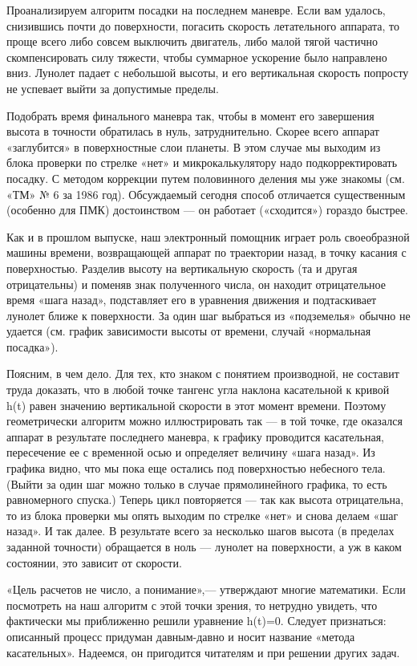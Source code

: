 \documentclass[11pt,a4paper,oneside]{article}
\begin{document}
Проанализируем алгоритм посадки на последнем маневре. Если вам удалось, снизившись почти до поверхности, погасить скорость летательного аппарата, то проще всего либо совсем выключить двигатель, либо малой тягой частично скомпенсировать силу тяжести, чтобы суммарное ускорение было направлено вниз. Лунолет падает с небольшой высоты, и его вертикальная скорость попросту не успевает выйти за допустимые пределы.

Подобрать время финального маневра так, чтобы в момент его завершения высота в точности обратилась в нуль, затруднительно. Скорее всего аппарат «заглубится» в поверхностные слои планеты. В этом случае мы выходим из блока проверки по стрелке «нет» и микрокалькулятору надо подкорректировать посадку. С методом коррекции путем половинного деления мы уже знакомы (см. «ТМ» № 6 за 1986 год). Обсуждаемый сегодня способ отличается существенным (особенно для ПМК) достоинством — он работает («сходится») гораздо быстрее.

Как и в прошлом выпуске, наш электронный помощник играет роль своеобразной машины времени, возвращающей аппарат по траектории назад, в точку касания с поверхностью. Разделив высоту на вертикальную скорость (та и другая отрицательны) и поменяв знак полученного числа, он находит отрицательное время «шага назад», подставляет его в уравнения движения и подтаскивает лунолет ближе к поверхности. За один шаг выбраться из «подземелья» обычно не удается (см. график зависимости высоты от времени, случай «нормальная посадка»). 

Поясним, в чем дело. Для тех, кто знаком с понятием производной, не составит труда доказать, что в любой точке тангенс угла наклона касательной к кривой h(t) равен значению вертикальной скорости в этот момент времени. Поэтому геометрически алгоритм можно иллюстрировать так — в той точке, где оказался аппарат в результате последнего маневра, к графику проводится касательная, пересечение ее с временной осью и определяет величину «шага назад». Из графика видно, что мы пока еще остались под поверхностью небесного тела. (Выйти за один шаг можно только в случае прямолинейного графика, то есть равномерного спуска.) Теперь цикл повторяется — так как высота отрицательна, то из блока проверки мы опять выходим по стрелке «нет» и снова делаем «шаг назад». И так далее. В результате всего за несколько шагов высота (в пределах заданной точности) обращается в ноль — лунолет на поверхности, а уж в каком состоянии, это зависит от скорости.

«Цель расчетов не число, а понимание»,— утверждают многие математики. Если посмотреть на наш алгоритм с этой точки зрения, то нетрудно увидеть, что фактически мы приближенно решили уравнение h(t)=0. Следует признаться: описанный процесс придуман давным-давно и носит название «метода касательных». Надеемся, он пригодится читателям и при решении других задач.
\end{document}

